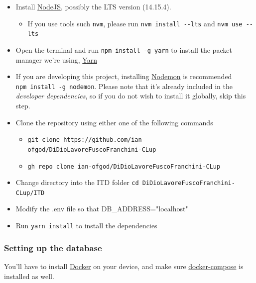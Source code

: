 \documentclass[
]{article}
\begin{document}
\begin{itemize}

\item
  Install \href{https://nodejs.org/}{NodeJS}, possibly the LTS version
  (14.15.4).

  \begin{itemize}
  
  \item
    If you use tools such \texttt{nvm}, please run
    \texttt{nvm\ install\ -\/-lts} and \texttt{nvm\ use\ -\/-lts}
  \end{itemize}
\item
  Open the terminal and run \texttt{npm\ install\ -g\ yarn} to install
  the packet manager we're using, \href{https://yarnpkg.com}{Yarn}
\item
  If you are developing this project, installing
  \href{https://github.com/remy/nodemon}{Nodemon} is recommended
  \texttt{npm\ install\ -g\ nodemon}. Please note that it's already
  included in the \emph{developer dependencies}, so if you do not wish
  to install it globally, skip this step.
\item
  Clone the repository using either one of the following commands

  \begin{itemize}
  
  \item
    \texttt{git\ clone\ https://github.com/ian-ofgod/DiDioLavoreFuscoFranchini-CLup}
  \item
    \texttt{gh\ repo\ clone\ ian-ofgod/DiDioLavoreFuscoFranchini-CLup}
  \end{itemize}
\item
  Change directory into the ITD folder
  \texttt{cd\ DiDioLavoreFuscoFranchini-CLup/ITD}

  \item Modify the .env file so that DB\_ADDRESS="localhost"

\item
  Run \texttt{yarn\ install} to install the dependencies
\end{itemize}

\hypertarget{setting-up-the-database}{%
\subsubsection{Setting up the database}\label{setting-up-the-database}}

You'll have to install \href{https://www.docker.com/}{Docker} on your
device, and make sure
\href{https://docs.docker.com/compose/install/}{docker-compose} is
installed as well.
\end{document}

